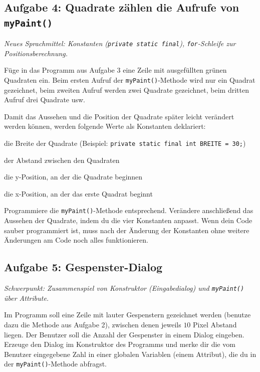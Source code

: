 \subsection{Aufgabe 4: Quadrate zählen die Aufrufe von \texttt{myPaint()} \tagLK}
\noindent \emph{Neues Sprachmittel: Konstanten (\texttt{private static final}), \texttt{for}-Schleife zur Positionsberechnung.}

Füge in das Programm aus Aufgabe 3 eine Zeile mit ausgefüllten grünen Quadraten
ein. Beim ersten Aufruf der \lstinline|myPaint()|-Methode wird nur ein Quadrat
gezeichnet, beim zweiten Aufruf werden zwei Quadrate gezeichnet, beim dritten
Aufruf drei Quadrate usw.

Damit das Aussehen und die Position der Quadrate später leicht verändert werden
können, werden folgende Werte als Konstanten deklariert:

\begin{compactitem}
\item die Breite der Quadrate (Beispiel: \lstinline|private static final int BREITE = 30;|)
\item der Abstand zwischen den Quadraten
\item die y-Position, an der die Quadrate beginnen
\item die x-Position, an der das erste Quadrat beginnt
\end{compactitem} 

Programmiere die \lstinline|myPaint()|-Methode entsprechend. Verändere
anschließend das Aussehen der Quadrate, indem du die vier Konstanten
anpasst. Wenn dein Code sauber programmiert ist, muss nach der Änderung der
Konstanten ohne weitere Änderungen am Code noch alles funktionieren.


\subsection{Aufgabe 5: Gespenster-Dialog \tagZusatz}
\noindent \emph{Schwerpunkt: Zusammenspiel von Konstruktor (Eingabedialog) und \texttt{myPaint()} über Attribute.}

Im Programm soll eine Zeile mit lauter Gespenstern gezeichnet werden (benutze
dazu die Methode aus Aufgabe 2), zwischen denen jeweils $10$ Pixel Abstand
liegen. Der Benutzer soll die Anzahl der Gespenster in einem Dialog eingeben.
Erzeuge den Dialog im Konstruktor des Programms und merke dir die vom Benutzer
eingegebene Zahl in einer globalen Variablen (einem Attribut), die du in der
\lstinline|myPaint()|-Methode abfragst.

